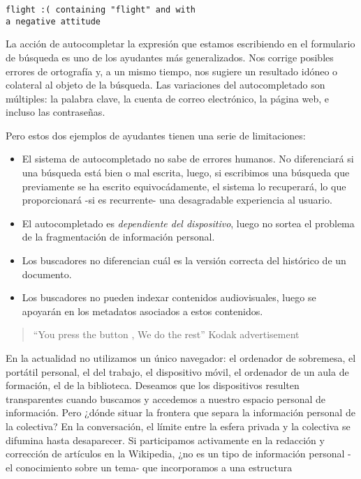 \documentclass[12pt, a4paper,twoside]{book}
\begin{document}
\begin{verbatim}
flight :( containing "flight" and with
a negative attitude
\end{verbatim}
La acción de autocompletar la expresión que estamos escribiendo en
el formulario de búsqueda es uno de los ayudantes más
generalizados. Nos corrige posibles errores de ortografía y, a un
mismo tiempo, nos sugiere un resultado idóneo o colateral al objeto
de la búsqueda. Las variaciones del autocompletado son múltiples:
la palabra clave, la cuenta de correo electrónico, la página web, e
incluso las contraseñas.

Pero estos dos ejemplos de ayudantes tienen una serie de
limitaciones:

\begin{itemize}
\item
  El sistema de autocompletado no sabe de errores humanos. No
  diferenciará si una búsqueda está bien o mal escrita, luego, si
  escribimos una búsqueda que previamente se ha escrito
  equivocádamente, el sistema lo recuperará, lo que proporcionará -si
  es recurrente- una desagradable experiencia al usuario.
\item
  El autocompletado es \emph{dependiente del dispositivo}, luego no
  sortea el problema de la fragmentación de información personal.
\item
  Los buscadores no diferencian cuál es la versión correcta del
  histórico de un documento.
\item
  Los buscadores no pueden indexar contenidos audiovisuales, luego se
  apoyarán en los metadatos asociados a estos contenidos.
\end{itemize}
\begin{quote}
``You press the button , We do the rest'' Kodak advertisement

\end{quote}
En la actualidad no utilizamos un único navegador: el ordenador de
sobremesa, el portátil personal, el del trabajo, el dispositivo
móvil, el ordenador de un aula de formación, el de la biblioteca.
Deseamos que los dispositivos resulten transparentes cuando
buscamos y accedemos a nuestro espacio personal de información.
Pero ¿dónde situar la frontera que separa la información personal
de la colectiva? En la conversación, el límite entre la esfera
privada y la colectiva se difumina hasta desaparecer. Si
participamos activamente en la redacción y corrección de artículos
en la Wikipedia, ¿no es un tipo de información personal -el
conocimiento sobre un tema- que incorporamos a una estructura
\end{document}

